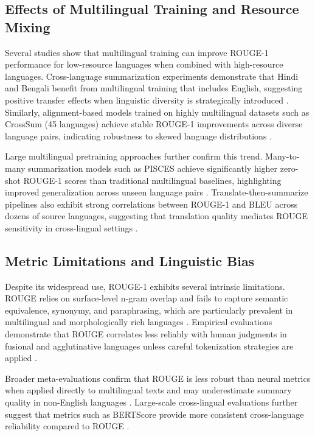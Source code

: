 \subsection{Effects of Multilingual Training and Resource Mixing}

Several studies show that multilingual training can improve ROUGE-1 performance for low-resource languages when combined with high-resource languages. Cross-language summarization experiments demonstrate that Hindi and Bengali benefit from multilingual training that includes English, suggesting positive transfer effects when linguistic diversity is strategically introduced \citep{jannat2025crosslanguage}. Similarly, alignment-based models trained on highly multilingual datasets such as CrossSum (45 languages) achieve stable ROUGE-1 improvements across diverse language pairs, indicating robustness to skewed language distributions \citep{li2023across}.

Large multilingual pretraining approaches further confirm this trend. Many-to-many summarization models such as PISCES achieve significantly higher zero-shot ROUGE-1 scores than traditional multilingual baselines, highlighting improved generalization across unseen language pairs \citep{wang2023pisces}. Translate-then-summarize pipelines also exhibit strong correlations between ROUGE-1 and BLEU across dozens of source languages, suggesting that translation quality mediates ROUGE sensitivity in cross-lingual settings \citep{varab2024translate}.

\subsection{Metric Limitations and Linguistic Bias}

Despite its widespread use, ROUGE-1 exhibits several intrinsic limitations. ROUGE relies on surface-level n-gram overlap and fails to capture semantic equivalence, synonymy, and paraphrasing, which are particularly prevalent in multilingual and morphologically rich languages \citep{ganesan2018rouge2}. Empirical evaluations demonstrate that ROUGE correlates less reliably with human judgments in fusional and agglutinative languages unless careful tokenization strategies are applied \citep{mondshine2025beyond}. 

Broader meta-evaluations confirm that ROUGE is less robust than neural metrics when applied directly to multilingual texts and may underestimate summary quality in non-English languages \citep{han2024metaeval, forde2024reevaluating}. Large-scale cross-lingual evaluations further suggest that metrics such as BERTScore provide more consistent cross-language reliability compared to ROUGE \citep{koto2021efficacy}.

